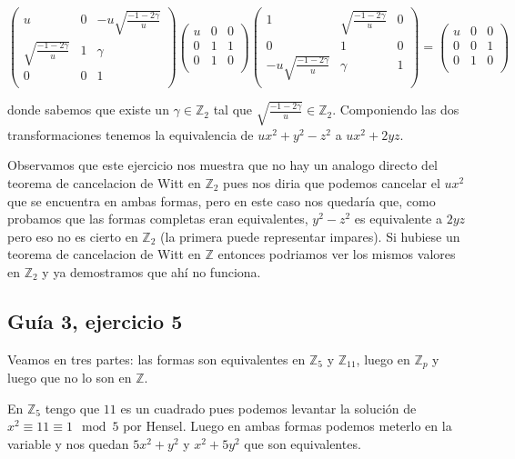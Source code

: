 \documentclass[12pt]{amsart}
\newcommand{\ZZ}{\mathbb{Z}}
\newcommand{\lp}{\left(}
\newcommand{\rp}{\right)}
\theoremstyle{plain}
\begin{document}
$$\lp\begin{matrix}
    u&0&-u\sqrt{\frac{-1-2\gamma}{u}} \\
    \sqrt{\frac{-1-2\gamma}{u}}&1&\gamma \\
    0&0&1 \\
\end{matrix}\rp
\lp\begin{matrix}
    u&0&0 \\
    0&1&1 \\
    0&1&0 \\
\end{matrix}\rp
\lp\begin{matrix}
    1&\sqrt{\frac{-1-2\gamma}{u}}&0 \\
    0&1&0 \\
    -u\sqrt{\frac{-1-2\gamma}{u}}&\gamma&1 \\
\end{matrix}\rp=
\lp\begin{matrix}
    u&0&0 \\
    0&0&1 \\
    0&1&0 \\
\end{matrix}\rp$$

donde sabemos que existe un $\gamma \in \ZZ_2$ tal que 
$\sqrt{\frac{-1-2\gamma}{u}}\in\ZZ_2$. Componiendo las dos 
transformaciones tenemos la equivalencia de $ux^2+y^2-z^2$ a
$ux^2+2yz$.

Observamos que este ejercicio nos muestra que no hay un analogo 
directo del teorema de cancelacion de Witt en $\ZZ_2$ pues nos 
diria que podemos cancelar el $ux^2$ que se encuentra en ambas 
formas, pero en este caso nos quedaría que, como probamos que las formas
completas eran equivalentes, $y^2-z^2$ es equivalente a $2yz$ pero
eso no es cierto en $\ZZ_2$ (la primera puede representar impares).
Si hubiese un teorema de cancelacion de Witt en $\ZZ$ entonces 
podriamos ver los mismos valores en $\ZZ_2$ y ya demostramos que 
ahí no funciona.

\subsection*{Guía 3, ejercicio 5}

Veamos en tres partes: las formas son equivalentes en $\ZZ_5$
y $\ZZ_{11}$, luego en $\ZZ_p$ y luego que no lo son en $\ZZ$.

En $\ZZ_5$ tengo que $11$ es un cuadrado pues podemos levantar
la solución de $x^2 \equiv 11\equiv 1 \mod 5$ por Hensel. Luego en 
ambas formas podemos meterlo en la variable y nos quedan 
$5x^2+y^2$ y $x^2+5y^2$ que son equivalentes.
\end{document}
